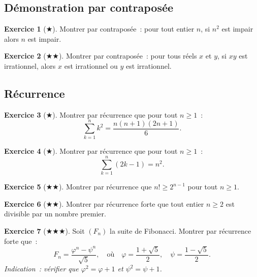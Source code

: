 \documentclass[12pt,a4paper,openany]{book}
\theoremstyle{definition}
\newtheorem{exercice}{Exercice}[chapter]
\theoremstyle{plain}
\theoremstyle{remark}
\begin{document}
\subsection*{D\'emonstration par contrapos\'ee}

\begin{exercice}[$\bigstar$]\label{exo:contrap-1}
  Montrer par contrapos\'ee~: pour tout entier $n$, si $n^2$ est impair alors $n$ est impair.
\end{exercice}

\begin{exercice}[$\bigstar\bigstar$]\label{exo:contrap-2}
  Montrer par contrapos\'ee~: pour tous r\'eels $x$ et $y$, si $xy$ est irrationnel, alors $x$ est irrationnel ou $y$ est irrationnel.
\end{exercice}

\subsection*{R\'ecurrence}

\begin{exercice}[$\bigstar$]\label{exo:rec-1}
  Montrer par r\'ecurrence que pour tout $n \geq 1$~:
  \[
    \sum_{k=1}^{n} k^2 = \frac{n(n+1)(2n+1)}{6}.
  \]
\end{exercice}

\begin{exercice}[$\bigstar$]\label{exo:rec-2}
  Montrer par r\'ecurrence que pour tout $n \geq 1$~:
  \[
    \sum_{k=1}^{n} (2k - 1) = n^2.
  \]
\end{exercice}

\begin{exercice}[$\bigstar\bigstar$]\label{exo:rec-3}
  Montrer par r\'ecurrence que $n! \geq 2^{n-1}$ pour tout $n \geq 1$.
\end{exercice}

\begin{exercice}[$\bigstar\bigstar$]\label{exo:rec-4}
  Montrer par r\'ecurrence forte que tout entier $n \geq 2$ est divisible par un nombre premier.
\end{exercice}

\begin{exercice}[$\bigstar\bigstar\bigstar$]\label{exo:rec-5}
  Soit $(F_n)$ la suite de Fibonacci. Montrer par r\'ecurrence forte que~:
  \[
    F_n = \frac{\varphi^n - \psi^n}{\sqrt{5}}, \quad \text{o\`u}\quad \varphi = \frac{1+\sqrt{5}}{2},\quad \psi = \frac{1-\sqrt{5}}{2}.
  \]
  \textit{Indication~: v\'erifier que $\varphi^2 = \varphi + 1$ et $\psi^2 = \psi + 1$.}
\end{exercice}
\end{document}
